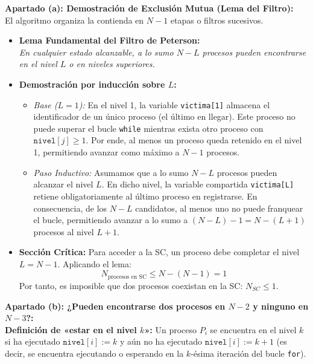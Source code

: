 \documentclass[11pt,a4paper,twoside,openright]{report}
\begin{document}
\begin{solucion}
\textbf{Apartado (a): Demostración de Exclusión Mutua (Lema del Filtro):}\\
El algoritmo organiza la contienda en $N-1$ etapas o filtros sucesivos.
\begin{itemize}[leftmargin=*]
    \item \textbf{Lema Fundamental del Filtro de Peterson:}\\
    \emph{En cualquier estado alcanzable, a lo sumo $N - L$ procesos pueden encontrarse en el nivel $L$ o en niveles superiores.}
    \item \textbf{Demostración por inducción sobre $L$:}
    \begin{itemize}[leftmargin=*]
        \item \emph{Base ($L = 1$):} En el nivel 1, la variable \texttt{victima[1]} almacena el identificador de un único proceso (el último en llegar). Este proceso no puede superar el bucle \texttt{while} mientras exista otro proceso con $\texttt{nivel}[j] \ge 1$. Por ende, al menos un proceso queda retenido en el nivel 1, permitiendo avanzar como máximo a $N - 1$ procesos.
        \item \emph{Paso Inductivo:} Asumamos que a lo sumo $N - L$ procesos pueden alcanzar el nivel $L$. En dicho nivel, la variable compartida \texttt{victima[L]} retiene obligatoriamente al último proceso en registrarse. En consecuencia, de los $N - L$ candidatos, al menos uno no puede franquear el bucle, permitiendo avanzar a lo sumo a $(N - L) - 1 = N - (L + 1)$ procesos al nivel $L+1$.
    \end{itemize}
    \item \textbf{Sección Crítica:} Para acceder a la SC, un proceso debe completar el nivel $L = N-1$. Aplicando el lema:
    \[
    N_{\text{procesos en SC}} \le N - (N - 1) = 1
    \]
    Por tanto, es imposible que dos procesos coexistan en la SC: $N_{SC} \le 1$.
\end{itemize}

\textbf{Apartado (b): ¿Pueden encontrarse dos procesos en $N-2$ y ninguno en $N-3$?:}\\
\textbf{Definición de «estar en el nivel $k$»:} Un proceso $P_i$ se encuentra en el nivel $k$ si ha ejecutado $\texttt{nivel}[i] := k$ y aún no ha ejecutado $\texttt{nivel}[i] := k+1$ (es decir, se encuentra ejecutando o esperando en la $k$-ésima iteración del bucle \texttt{for}).


\end{solucion}
\end{document}
